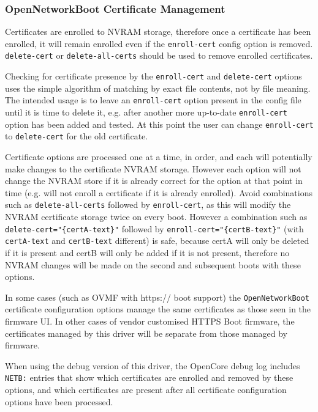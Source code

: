 \documentclass[]{article}
\begin{document}
\subsubsection{OpenNetworkBoot Certificate Management}

Certificates are enrolled to NVRAM storage, therefore once
a certificate has been enrolled, it will remain enrolled even if the \texttt{enroll-cert} config
option is removed. \texttt{delete-cert} or \texttt{delete-all-certs}
should be used to remove enrolled certificates.

Checking for certificate presence by the \texttt{enroll-cert}
and \texttt{delete-cert} options uses the simple algorithm
of matching by exact file contents, not by file meaning. The intended
usage is to leave an \texttt{enroll-cert} option present in the config
file until it is time to delete it, e.g. after another more up-to-date
\texttt{enroll-cert} option has been added and tested. At this point
the user can change \texttt{enroll-cert} to \texttt{delete-cert}
for the old certificate. \medskip

Certificate options are processed one at a time, in
order, and each will potentially make changes to the certificate NVRAM storage.
However each option will not change the NVRAM store if it is already correct
for the option at that point in time (e.g. will not enroll a certificate if it is
already enrolled).
Avoid combinations such as \texttt{delete-all-certs} followed by
\texttt{enroll-cert}, as this will modify the NVRAM certificate
storage twice on every boot. However a combination such as
\texttt{delete-cert="\{certA-text\}"} followed by \texttt{enroll-cert="\{certB-text\}"}
(with \texttt{certA-text} and \texttt{certB-text} different) is safe,
because certA will only be deleted if it is present
and certB will only be added if it is not present, therefore no
NVRAM changes will be made on the second and subsequent boots
with these options.

In some cases (such as OVMF with https:// boot support) the
\texttt{OpenNetworkBoot} certificate configuration options manage the same
certificates as those seen in the firmware UI. In other cases of vendor customised
HTTPS Boot firmware, the certificates managed by this driver will be
separate from those managed by firmware.

When using the debug version of this driver, the OpenCore debug log includes \texttt{NETB:} entries
that show which certificates are enrolled and removed by these options, and which
certificates are present after all certificate configuration options have been processed.
\end{document}

